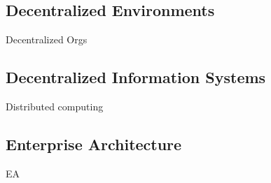 \subsection{Decentralized Environments}
Decentralized Orgs

\subsection{Decentralized Information Systems}
Distributed computing

\subsection{Enterprise Architecture}
EA